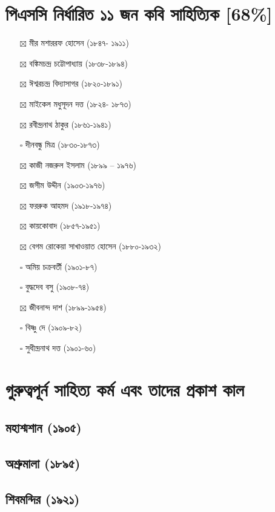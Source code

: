 \documentclass[11pt]{article}
\begin{document}
\section{পিএসসি নির্ধারিত ১১ জন কবি সাহিত্যিক [68\%]}
\label{sec:orge8c9c60}

\begin{itemize}
\item[{$\boxtimes$}] মীর মশাররফ হোসেন (১৮৪৭- ১৯১১)
\item[{$\boxtimes$}] বঙ্কিমচন্দ্র চট্টোপাধ্যায়  (১৮৩৮-১৮৯৪)
\item[{$\boxtimes$}] ঈশ্বরচন্দ্র বিদ্যাসাগর (১৮২০-১৮৯১)
\item[{$\boxtimes$}] মাইকেল মধুসূদন দত্ত (১৮২৪- ১৮৭৩)
\item[{$\boxtimes$}] রবীন্দ্রনাথ ঠাকুর (১৮৬১-১৯৪১)
\item[{$\square$}] দীনবন্ধু মিত্র (১৮৩০-১৮৭৩)
\item[{$\boxtimes$}] কাজী নজরুল ইসলাম (১৮৯৯ – ১৯৭৬)
\item[{$\boxtimes$}] জসীম উদ্দীন (১৯০৩-১৯৭৬)
\item[{$\boxtimes$}] ফররুক আহমদ (১৯১৮-১৯৭৪)
\item[{$\boxtimes$}] কায়কোবাদ (১৮৫৭-১৯৫১)
\item[{$\boxtimes$}] বেগম রোকেয়া সাখাওয়াত হোসেন (১৮৮০-১৯৩২)
\item[{$\square$}] অমিয় চক্রবর্তী (১৯০১-৮৭)
\item[{$\square$}] বুদ্ধদেব বসু (১৯০৮-৭৪)
\item[{$\boxtimes$}] জীবনান্দ দাশ (১৮৯৯-১৯৫৪)
\item[{$\square$}] বিষ্ণু দে (১৯০৯-৮২)
\item[{$\square$}] সুধীন্দ্রনাথ দত্ত (১৯০১-৬০)
\end{itemize}


\section{গুরুত্বপূর্ন সাহিত্য কর্ম এবং তাদের প্রকাশ কাল}
\label{sec:orgf4ec84e}

\subsection{মহাশ্মশান (১৯০৫)}
\label{sec:org31f9d47}
\subsection{অশ্রুমালা (১৮৯৫)}
\label{sec:orged2097b}
\subsection{শিবমন্দির (১৯২১)}
\label{sec:org11b19fa}
\end{document}

